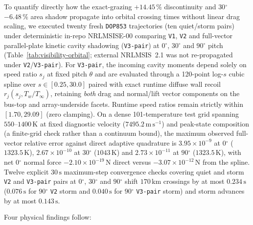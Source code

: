 \documentclass[12pt]{article}
\newcommand{\unit}[1]{\,\mathrm{#1}}
\newcommand{\degree}{\ensuremath{{}^\circ}}
\begin{document}
To quantify directly how the exact-grazing $+14.45\,\%$ discontinuity and $30\degree$ $-6.48\,\%$ area shadow propagate into orbital crossing times without linear drag scaling, we executed twenty fresh \texttt{DOP853} trajectories (ten quiet/storm pairs) under deterministic in-repo NRLMSISE-00 comparing \texttt{V1}, \texttt{V2} and full-vector parallel-plate kinetic cavity shadowing (\texttt{V3-pair}) at $0\degree$, $30\degree$ and $90\degree$ pitch (Table~\ref{tab:visibility-orbital}; external NRLMSIS~2.1 was not re-propagated under \texttt{V2}/\texttt{V3-pair}). For \texttt{V3-pair}, the incoming cavity moments depend solely on speed ratio $s_j$ at fixed pitch $\theta$ and are evaluated through a 120-point log-$s$ cubic spline over $s \in [0.25, 30.0]$ paired with exact runtime diffuse wall recoil $r_j(s_j, T_w/T_\infty)$, retaining \emph{both} drag and normal/lift vector components on the bus-top and array-underside facets. Runtime speed ratios remain strictly within $[1.70, 29.09]$ (zero clamping). On a dense 101-temperature test grid spanning $550$--$1400\unit{K}$ at fixed diagnostic velocity ($7495.2\unit{m\,s^{-1}}$) and peak-state composition (a finite-grid check rather than a continuum bound), the maximum observed full-vector relative error against direct adaptive quadrature is $3.95\times10^{-9}$ at $0\degree$ ($1323.5\unit{K}$), $2.67\times10^{-10}$ at $30\degree$ ($1043\unit{K}$) and $2.73\times10^{-11}$ at $90\degree$ ($1323.5\unit{K}$), with net $0\degree$ normal force $-2.10\times10^{-19}\unit{N}$ direct versus $-3.07\times10^{-12}\unit{N}$ from the spline. Twelve explicit $30\unit{s}$ maximum-step convergence checks covering quiet and storm \texttt{V2} and \texttt{V3-pair} pairs at $0\degree$, $30\degree$ and $90\degree$ shift $170\unit{km}$ crossings by at most $0.234\unit{s}$ ($0.076\unit{s}$ for $90\degree$ \texttt{V2} storm and $0.040\unit{s}$ for $90\degree$ \texttt{V3-pair} storm) and storm advances by at most $0.143\unit{s}$.

Four physical findings follow:
\end{document}
